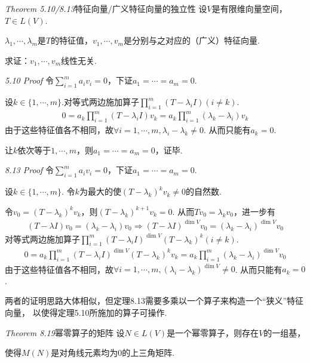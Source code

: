 \textit{Theorem 5.10/8.13}{\kaishu 特征向量/广义特征向量的独立性}
设\(V\)是有限维向量空间，\(T \in L(V)\).

\(\lambda_1,\cdots,\lambda_m\)是\(T\)的特征值，\(v_1,\cdots,v_m\)是分别与之对应的（广义）特征向量.

求证：\(v_1,\cdots,v_m\)线性无关.

\textit{5.10 Proof}
令\(\sum_{i=1}^m a_iv_i=0\)，下证\(a_1=\cdots=a_m=0\).

设\(k \in \{1,\cdots,m\}\).对等式两边施加算子\(\prod_{i=1}^m (T-\lambda_i I)(i \ne k)\).
    \begin{align*}
        0=a_{k}\prod_{i=1}^m (T-\lambda_i I) v_{k}=
        a_{k}\prod_{i=1}^m (\lambda_{k}-\lambda_i) v_{k}
    \end{align*}
由于这些特征值各不相同，故\(\forall i=1,\cdots,m,\lambda_i-\lambda_{k} \ne 0\).
从而只能有\(a_{k}=0\).

让\(k\)依次等于\(1,\cdots,m\)，则\(a_1=\cdots=a_m=0\)，证毕.

\textit{8.13 Proof}
令\(\sum_{i=1}^m a_iv_i=0\)，下证\(a_1=\cdots=a_m=0\).

设\(k \in \{1,\cdots,m\}\).
令\(k\)为最大的使\((T-\lambda_{k})^k v_{k} \ne 0\)的自然数.

令\(v_0=(T-\lambda_{k})^k v_{k}\)，则\((T-\lambda_{k})^{k+1} v_{k}=0\).
从而\(Tv_0=\lambda_{k}v_0\)，进一步有
    \begin{align*}
        (T-\lambda I)v_0=(\lambda_{k}-\lambda_i)v_0 \Rightarrow 
        (T-\lambda I)^{\dim V} v_0=(\lambda_{k}-\lambda_i)^{\dim V}v_0
    \end{align*}
对等式两边施加算子\(\prod_{i=1}^m (T-\lambda_i I)^{\dim V}(T-\lambda_{k})^k(i \ne k)\).
    \begin{align*}
        0=a_{k}\prod_{i=1}^m (T-\lambda_i I)^{\dim V}(T-\lambda_{k})^k v_{k}
        =a_{k}\prod_{i=1}^m (\lambda_{k}-\lambda_i)^{\dim V} v_0
    \end{align*}
由于这些特征值各不相同，故\(\forall i=1,\cdots,m,(\lambda_i-\lambda_{k})^{\dim V} \ne 0\).
从而只能有\(a_{k}=0\).

两者的证明思路大体相似，但定理8.13需要多乘以一个算子来构造一个“狭义”特征向量，
以使得定理5.10所施加的算子可操作.

\hspace*{\fill}

\textit{Theorem 8.19}{\kaishu 幂零算子的矩阵}
设\(N \in L(V)\)是一个幂零算子，则存在\(V\)的一组基，

使得\(M(N)\)是对角线元素均为\(0\)的上三角矩阵.

